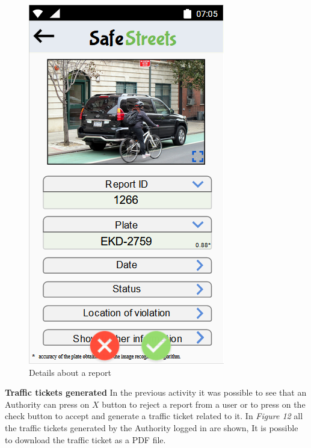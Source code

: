     \begin{figure}[h]
        \centering
        \includegraphics[scale=0.85]{Images/violation_info.png}
        \caption{Details about a report}
    \end{figure}\newline
    \textbf{Traffic tickets generated}\newline
    In the previous activity it was possible to see that an Authority can press on $X$ button to reject a report from a user or to press on the check button to accept and  generate a traffic ticket related to it. In \textit{Figure 12} all the traffic tickets generated by the Authority logged in are shown, It is possible to download the traffic ticket as a PDF file.
